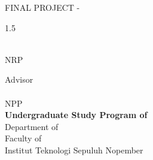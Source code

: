 \begin{large}
  FINAL PROJECT - \coursecode{}
\end{large}

\vspace{\fill}

\begin{spacing}{1.5}
  \begin{LARGE}
    \textbf{\engtatitle{}}
  \end{LARGE}
\end{spacing}

\vspace{\fill}

\begin{large}
  \textbf{\name{}} \\
  \textmd{NRP \nrp{}}

  \vspace{\fill}

  \textmd{Advisor} \\
  \textbf{\advisor{}} \\
  \textmd{NPP \advisornip{}} \\

  \vspace{\fill}
  \textbf{Undergraduate Study Program of \engstudyprogram{}} \\

  Department of \engdepartment{} \\
  Faculty of \engfaculty{} \\
  Institut Teknologi Sepuluh Nopember \\
  \place{} \\
  \the\year{}
\end{large}
